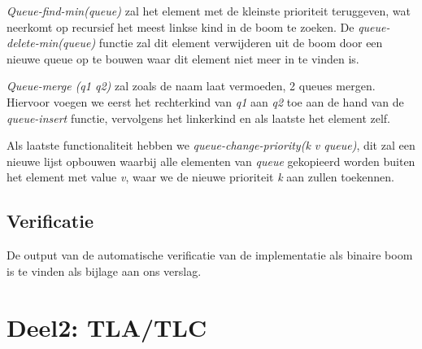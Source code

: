 \documentclass[a4paper,10pt]{article}
\begin{document}
\emph{Queue-find-min(queue)} zal het element met de kleinste prioriteit  teruggeven, wat neerkomt op recursief het meest linkse kind in de boom te zoeken. De \emph{queue-delete-min(queue)} functie zal dit element verwijderen uit de boom door een nieuwe queue op te bouwen waar dit element niet meer in te vinden is.  

\emph{Queue-merge (q1 q2)} zal zoals de naam laat vermoeden, 2 queues mergen. Hiervoor voegen we eerst het rechterkind van \emph{q1} aan \emph{q2} toe aan de hand van de \emph{queue-insert} functie, vervolgens het linkerkind en als laatste het element zelf. 

Als laatste functionaliteit hebben we \emph{queue-change-priority(k v queue)}, dit zal een nieuwe lijst opbouwen waarbij alle elementen van \emph{queue} gekopieerd worden buiten het element met value \emph{v}, waar we de nieuwe prioriteit \emph{k} aan zullen toekennen.

\subsection{Verificatie}

De output van de automatische verificatie van de implementatie als binaire boom is te vinden als bijlage aan ons verslag. 


\section{Deel2: TLA/TLC}
\end{document}
